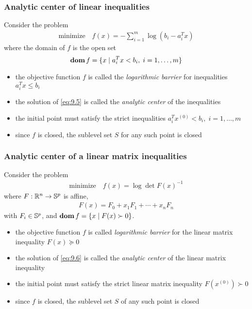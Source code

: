 \subsubsection{Analytic center of linear inequalities}
Consider the problem
\begin{align}
  \text{minimize}\quad f(x)=-\sum_{i=1}^m\log(b_i-a_i^Tx)\label{eq:9.5}
\end{align}
where the domain of $f$ is the open set
\begin{align*}
  \mathop{\bf dom} f=\{x\mid a_i^Tx<b_i,\;i=1,\dots,m\}
\end{align*}
\begin{itemize}
  \item the objective function $f$ is called the \textit{logarithmic barrier} for inequalities $a_i^Tx\le b_i$
  \item the solution of \eqref{eq:9.5} is called the \textit{analytic center} of the inequalities
  \item the initial point must satisfy the strict inequalities $a_i^Tx^{(0)}<b_i,\;i=1,\dots,m$
  \item since $f$ is closed, the sublevel set $S$ for any such point is closed
\end{itemize}

\subsubsection{Analytic center of a linear matrix inequalities}
Consider the problem
\begin{align}
  \text{minimize}\quad f(x)=\log\det F(x)^{-1}\label{eq:9.6}
\end{align}
where $F:\mathbb{R}^n\rightarrow \mathbb{S}^p$ is affine, \ie
\begin{align*}
  F(x)=F_0+x_1F_1+\cdots+x_nF_n
\end{align*}
with $F_i\in\mathbb{S}^p$, and $\mathop{\bf dom} f=\{x\mid F(x)\succ 0\}$.\par
\begin{itemize}
  \item the objective function $f$ is called \textit{logarithmic barrier} for the linear matrix inequality $F(x)\succeq 0$
  \item the solution of \eqref{eq:9.6} is called the \textit{analytic center} of the linear matrix inequality
  \item the initial point must satisfy the strict linear matrix inequality $F(x^{(0)})\succ 0$
  \item since $f$ is closed, the sublevel set $S$ of any such point is closed
\end{itemize}

